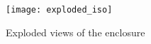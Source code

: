 \begin{figure}[H]
  \centering
  \texttt{[image: exploded\_iso]}
\caption{Exploded views of the enclosure}
\label{fig:exploded_views}
\end{figure}



